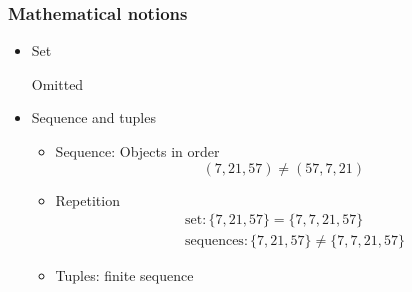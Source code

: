 



\begin{frame}[allowframebreaks] \frametitle{Mathematical notions}
  \begin{itemize}

\item Set

Omitted
\item Sequence and tuples

  \begin{itemize}
  \item Sequence: Objects in order
    \begin{equation*}
      (7,21,57) \neq (57,7,21)
    \end{equation*}
  \item Repetition
    \begin{eqnarray*}
      && \mbox{set}: \{7,21,57\}=\{7,7,21,57\}\\
&& \mbox{sequences}: \{7,21,57\}\neq \{7,7,21,57\}
    \end{eqnarray*}
  \item Tuples: finite sequence


\end{itemize}
\end{itemize}
\end{frame}

